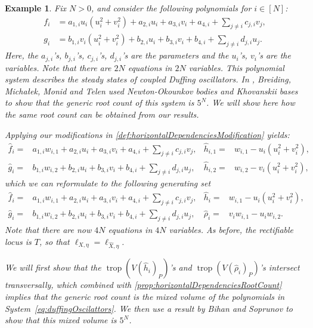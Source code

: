 \documentclass[12pt,reqno,a4paper]{amsart}
\theoremstyle{theoremstyle}
\theoremstyle{examplestyle}
\newtheorem{example}[theorem]{Example}
\theoremstyle{algorithmstyle}
\DeclareMathOperator{\trop}{trop}
\begin{document}
\begin{example}\label{exa:DuffingOscillators}
  Fix $N>0$, and consider the following polynomials for $i\in[N]$:
  \begin{align*}
    f_{i}&=a_{1,i}u_{i}(u_{i}^{2}+v_{i}^{2})+a_{2,i}u_{i}+a_{3,i}v_{i}+a_{4,i}+\sum_{j\neq{i}} c_{j,i}v_{j},\\
    g_{i}&=b_{1,i}v_{i}(u_{i}^{2}+v_{i}^{2})+b_{2,i}u_{i}+b_{3,i}v_{i}+b_{4,i}+\sum_{j\neq{i}} d_{j,i}u_{j}.
  \end{align*}
  Here, the $a_{j,i}$'s, $b_{j,i}$'s, $c_{j,i}$'s, $d_{j,i}$'s are the parameters and the $u_{i}$'s, $v_{i}$'s are the variables. Note that there are $2N$ equations in $2N$ variables.   This polynomial system describes the steady states of coupled Duffing oscillators. In \cite{BMMT2022}, Breiding, Michałek, Monid and Telen used %
  Newton-Okounkov bodies and Khovanskii bases to show that the generic root count of this system is $5^{N}$. %
  We will show here how the same root count can be obtained from our results. %

  Applying our modifications in \cref{def:horizontalDependenciesModification} yields:
  \allowdisplaybreaks
  \begin{align*}
    \hat{f}_{i}=&a_{1,i}w_{i,1}+a_{2,i}u_{i}+a_{3,i}v_{i}+a_{4,i}+\sum_{j\neq{i}} c_{j,i}v_{j},& \hat h_{i,1}=&w_{i,1}-u_{i}(u_{i}^{2}+v_{i}^{2}),\\
    \hat{g}_{i}=&b_{1,i}w_{i,2}+b_{2,i}u_{i}+b_{3,i}v_{i}+b_{4,i}+\sum_{j\neq{i}} d_{j,i}u_{j},& \hat h_{i,2}=&w_{i,2}-v_{i}(u_{i}^{2}+v_{i}^{2}),
  \end{align*}
  which we can reformulate to the following generating set
  \begin{equation}\label{eq:duffingOscilattors}
    \begin{aligned}
      \hat{f}_{i}=&a_{1,i}w_{i,1}+a_{2,i}u_{i}+a_{3,i}v_{i}+a_{4,i}+\sum_{j\neq{i}} c_{j,i}v_{j},& \hat h_{i}=&w_{i,1}-u_{i}(u_{i}^{2}+v_{i}^{2}),\\
      \hat{g}_{i}=&b_{1,i}w_{i,2}+b_{2,i}u_{i}+b_{3,i}v_{i}+b_{4,i}+\sum_{j\neq{i}} d_{j,i}u_{j},& \hat \rho_{i}=&v_{i}w_{i,1}-u_{i}w_{i,2}.
    \end{aligned}
  \end{equation}
  Note that there are now $4N$ equations in $4N$ variables.
  As before, the rectifiable locus is $T$, so that $\ell_{X,\eta}=\ell_{\widehat{X},\eta}$.

  We will first show that the $\trop(V(\hat h_i)_P)$'s and $\trop(V(\hat \rho_i)_P)$'s intersect transversally, which combined with \cref{prop:horizontalDependenciesRootCount} implies that the generic root count is the mixed volume of the polynomials in System~\eqref{eq:duffingOscilattors}. We then use a result by Bihan and Soprunov \cite{BihanSoprunov2019} to show that this mixed volume is $5^N$.


\end{example}
\end{document}
